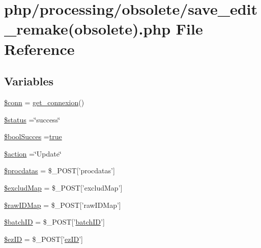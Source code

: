 \hypertarget{save__edit__remake_07obsolete_08_8php}{\section{php/processing/obsolete/save\-\_\-edit\-\_\-remake(obsolete).php File Reference}
\label{save__edit__remake_07obsolete_08_8php}
}
\subsection*{Variables}
\begin{DoxyCompactItemize}
\item 
\hyperlink{save__edit__remake_07obsolete_08_8php_aa8a5a87b9c1a6a0819b88447cbe41877}{\$conn} = \hyperlink{php__functions_8php_ace18bc10f3fd08f92688ac743e0d8c2e}{get\-\_\-connexion}()
\item 
\hyperlink{save__edit__remake_07obsolete_08_8php_a58391ea75f2d29d5d708d7050b641c33}{\$status} =\char`\"{}success\char`\"{}
\item 
\hyperlink{save__edit__remake_07obsolete_08_8php_a538eaf07e91a8c4f140bc04fa2b899cf}{\$bool\-Succes} =\hyperlink{obsolete_2processing__bak_8php_ad85b26c88897c4f65b1a4930711a2e93}{true}
\item 
\hyperlink{save__edit__remake_07obsolete_08_8php_aa698a3e72116e8e778be0e95d908ee30}{\$action} =\char`\"{}Update\char`\"{}
\item 
\hyperlink{save__edit__remake_07obsolete_08_8php_a5a756a18d8cc040338f041ca8f8c3666}{\$procdatas} = \$\-\_\-\-P\-O\-S\-T\mbox{[}'procdatas'\mbox{]}
\item 
\hyperlink{save__edit__remake_07obsolete_08_8php_a296195c83717b71c16843c3c951e29a2}{\$exclud\-Map} = \$\-\_\-\-P\-O\-S\-T\mbox{[}'exclud\-Map'\mbox{]}
\item 
\hyperlink{save__edit__remake_07obsolete_08_8php_a2c543a123b646cdf11c814983d4a13cf}{\$raw\-I\-D\-Map} = \$\-\_\-\-P\-O\-S\-T\mbox{[}'raw\-I\-D\-Map'\mbox{]}
\item 
\hyperlink{save__edit__remake_07obsolete_08_8php_aaa6d122ea9cb55b210aadd86e5654a74}{\$batch\-I\-D} = \$\-\_\-\-P\-O\-S\-T\mbox{[}'\hyperlink{obsolete_2processing__bak_8php_a88c5bc4262b7c34f236357f5c53fc99b}{batch\-I\-D}'\mbox{]}
\item 
\hyperlink{save__edit__remake_07obsolete_08_8php_addb1ec3ba55e413a08cb006ce21974df}{\$ez\-I\-D} = \$\-\_\-\-P\-O\-S\-T\mbox{[}'\hyperlink{admin_rawdata_8php_adf465cadf95987152966d26567509f92}{ez\-I\-D}'\mbox{]}

\end{DoxyCompactItemize}
